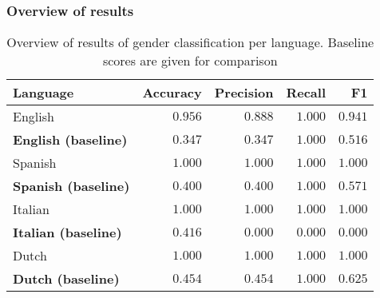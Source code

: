 \documentclass[utf8]{beamer}
\begin{document}
\begin{frame}
		\frametitle{Overview of results}
	\begin{table}
		\caption{Overview of results of gender classification per language. Baseline scores are given for comparison}
		\label{tab:scores-gender}
		\begin{center}
			\begin{tabular}{l|rrrr}
				\toprule
				Language & Accuracy & Precision & Recall & F1 \\
				\midrule
				English & $ 0.956 $ & $ 0.888 $ & $ 1.000 $ & $ 0.941 $ \\
				\textbf{English (baseline)} & $ 0.347 $ & $ 0.347 $ & $ 1.000 $ & $ 0.516 $ \\
				Spanish & $ 1.000 $ & $ 1.000 $ & $ 1.000 $ & $ 1.000 $ \\
				\textbf{Spanish (baseline)} & $ 0.400 $ & $ 0.400 $ & $ 1.000 $ & $ 0.571 $ \\
				Italian & $ 1.000 $ & $ 1.000 $ & $ 1.000 $ & $ 1.000 $ \\
				\textbf{Italian (baseline)} & $ 0.416 $ & $ 0.000 $ & $ 0.000 $ & $ 0.000 $ \\
				Dutch & $ 1.000 $ & $ 1.000 $ & $ 1.000 $ & $ 1.000 $ \\
				\textbf{Dutch (baseline)} & $ 0.454 $ & $ 0.454 $ & $ 1.000 $ & $ 0.625 $ \\
				\bottomrule
			\end{tabular}
		\end{center}
	\end{table}
\end{frame}
\end{document}
